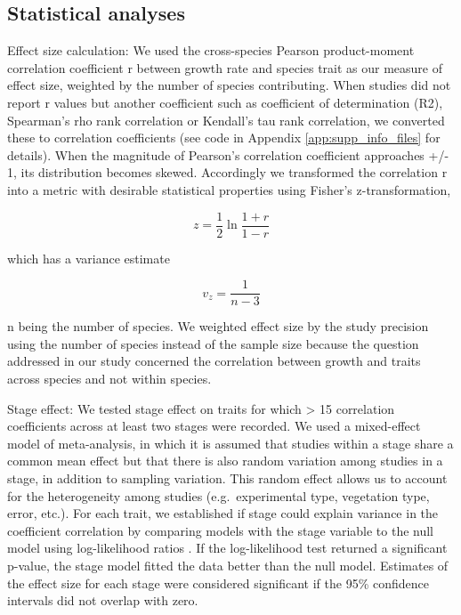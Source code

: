 \documentclass[a4paper]{article}\usepackage[]{graphicx}\usepackage[]{color}
\begin{document}
\subsection*{Statistical analyses}\label{statistical-analyses}

Effect size calculation:
We used the cross-species Pearson product-moment correlation coefficient r between growth rate and species trait as our measure of effect size, weighted by the number of species contributing. When studies did not report r values but another coefficient such as coefficient of determination (R2), Spearman's rho rank correlation or Kendall's tau rank correlation, we converted these to correlation coefficients  \citep{Lajeunesse:2013tm} (see code in Appendix \ref{app:supp_info_files} for details). When the magnitude of Pearson's correlation coefficient approaches +/- 1, its distribution becomes skewed. Accordingly we transformed the correlation r into a metric with desirable statistical properties using Fisher's z-transformation,

\[ z = \frac{1}{2} \ln \frac{1+r}{1-r} \]

which has a variance estimate

\[ v_z= \frac{1}{n-3} \]

n being the number of species. We weighted effect size by the study precision using the number of species instead of the sample size because the question addressed in our study concerned the correlation between growth and traits across species and not within species.

Stage effect:
We tested stage effect on traits for which > 15 correlation coefficients across at least two stages were recorded. We used a mixed-effect model of meta-analysis, in which it is assumed that studies within a stage share a common mean effect but that there is also random variation among studies in a stage, in addition to sampling variation. This random effect allows us to account for the heterogeneity among studies (e.g.~experimental type, vegetation type, error, etc.). For each trait, we established if stage could explain variance in the coefficient correlation by comparing models with the stage variable to the null model using log-likelihood ratios \citep{Zuur:2009cfa}. If the log-likelihood test returned a significant p-value, the stage model fitted the data better than the null model. Estimates of the effect size for each stage were considered significant if the 95\% confidence intervals did not overlap with zero.
\end{document}
